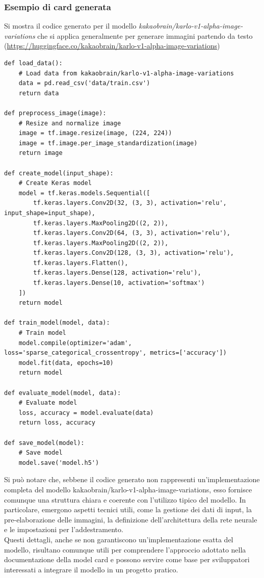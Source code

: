 \documentclass{article}
\begin{document}
\subsubsection{Esempio di card generata}
Si mostra il codice generato per il modello \textit{kakaobrain/karlo-v1-alpha-image-variations} che si applica generalmente per generare immagini partendo da testo (\url{https://huggingface.co/kakaobrain/karlo-v1-alpha-image-variations})
\begin{lstlisting}
def load_data():
    # Load data from kakaobrain/karlo-v1-alpha-image-variations
    data = pd.read_csv('data/train.csv')
    return data

def preprocess_image(image):
    # Resize and normalize image
    image = tf.image.resize(image, (224, 224))
    image = tf.image.per_image_standardization(image)
    return image

def create_model(input_shape):
    # Create Keras model
    model = tf.keras.models.Sequential([
        tf.keras.layers.Conv2D(32, (3, 3), activation='relu', input_shape=input_shape),
        tf.keras.layers.MaxPooling2D((2, 2)),
        tf.keras.layers.Conv2D(64, (3, 3), activation='relu'),
        tf.keras.layers.MaxPooling2D((2, 2)),
        tf.keras.layers.Conv2D(128, (3, 3), activation='relu'),
        tf.keras.layers.Flatten(),
        tf.keras.layers.Dense(128, activation='relu'),
        tf.keras.layers.Dense(10, activation='softmax')
    ])
    return model

def train_model(model, data):
    # Train model
    model.compile(optimizer='adam', loss='sparse_categorical_crossentropy', metrics=['accuracy'])
    model.fit(data, epochs=10)
    return model

def evaluate_model(model, data):
    # Evaluate model
    loss, accuracy = model.evaluate(data)
    return loss, accuracy

def save_model(model):
    # Save model
    model.save('model.h5')
\end{lstlisting}
Si può notare che, sebbene il codice generato non rappresenti un'implementazione completa del modello kakaobrain/karlo-v1-alpha-image-variations, esso fornisce comunque una struttura chiara e coerente con l’utilizzo tipico del modello. In particolare, emergono aspetti tecnici utili, come la gestione dei dati di input, la pre-elaborazione delle immagini, la definizione dell’architettura della rete neurale e le impostazioni per l’addestramento.\\
Questi dettagli, anche se non garantiscono un’implementazione esatta del modello, risultano comunque utili per comprendere l’approccio adottato nella documentazione della model card e possono servire come base per sviluppatori interessati a integrare il modello in un progetto pratico.
\end{document}
